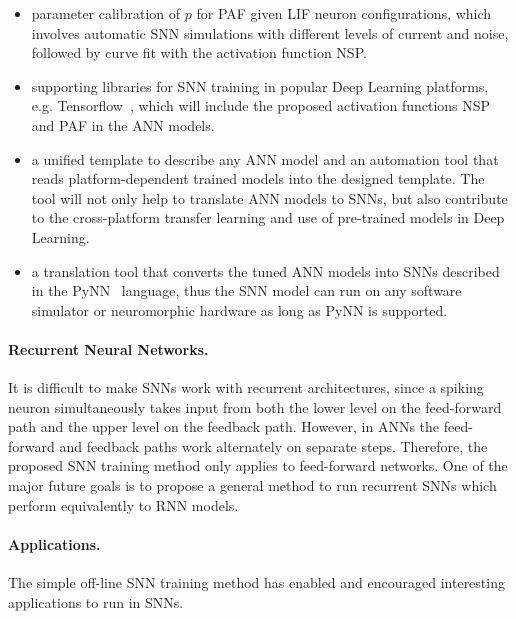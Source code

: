 \begin{itemize}
	\item parameter calibration of $p$ for PAF given LIF neuron configurations, which involves automatic SNN simulations with different levels of current and noise, followed by curve fit with the activation function NSP. 
	
	\item supporting libraries for SNN training in popular Deep Learning platforms, e.g. Tensorflow~\citep{abadi2016tensorflow}, which will include the proposed activation functions NSP and PAF in the ANN models.
	
	\item a unified template to describe any ANN model and an automation tool that reads platform-dependent trained models into the designed template.
	The tool will not only help to translate ANN models to SNNs, but also contribute to the cross-platform transfer learning and use of pre-trained models in Deep Learning.
	
	\item a translation tool that converts the tuned ANN models into SNNs described in the PyNN~\citep{davison2008pynn} language, thus the SNN model can run on any software simulator or neuromorphic hardware as long as PyNN is supported.
\end{itemize}

\paragraph{Recurrent Neural Networks.}
It is difficult to make SNNs work with recurrent architectures, since a spiking neuron simultaneously takes input from both the lower level on the feed-forward path and the upper level on the feedback path.
However, in ANNs the feed-forward and feedback paths work alternately on separate steps.
Therefore, the proposed SNN training method only applies to feed-forward networks.
One of the major future goals is to propose a general method to run recurrent SNNs which perform equivalently to RNN models.

\paragraph{Applications.}
The simple off-line SNN training method has enabled and encouraged interesting applications to run in SNNs.


